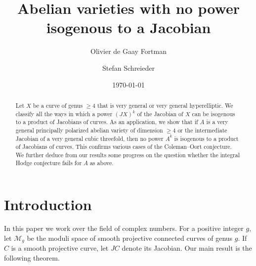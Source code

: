 \documentclass[a4paper,11pt,reqno]{amsart}
\numberwithin{equation}{section}
\theoremstyle{plain}
\theoremstyle{definition}
\newcommand{\ca}[1]{{\mathcal{#1}}}
\begin{document}
    

\title[Abelian varieties with no power isogenous to a Jacobian]{Abelian varieties with no power isogenous to a Jacobian}

\author{Olivier de Gaay Fortman} 

\address{Department of Mathematics, Utrecht University,  Budapestlaan 6, 3584 CD Utrecht, The Netherlands.}



\author{Stefan Schreieder} 
\address{Institute of Algebraic Geometry, Leibniz University Hannover, Welfengarten 1, 30167 Hannover, Germany.}


\date{\today}




 \begin{abstract} 
 Let $X$ be a curve of genus $\geq 4$ that is very general or very general hyperelliptic.
 We classify all the ways in which a power $(JX)^k$ of the Jacobian of $X$ can be isogenous to a product of Jacobians of curves.
 As an application, we show that if $A$ is a very general principally polarized abelian variety of dimension $\geq 4$ or the intermediate Jacobian of a very general cubic threefold, then no power $A^k$ is isogenous to a product of Jacobians of curves.
This confirms various cases of the Coleman--Oort conjecture.
We further deduce from our results some progress on the question whether the integral Hodge conjecture fails for $A$ as above.
 \end{abstract}

\maketitle 

\tableofcontents

 \newpage
 
\section{Introduction} \label{section:introduction}

In this paper we work over the field of complex numbers. 
For a positive integer $g$, let $\ca M_g$ be the moduli space of smooth projective connected curves of genus $g$. If $C$ is a smooth projective curve, let $JC$ denote its Jacobian. 
Our main result is the following theorem. 
\end{document}
